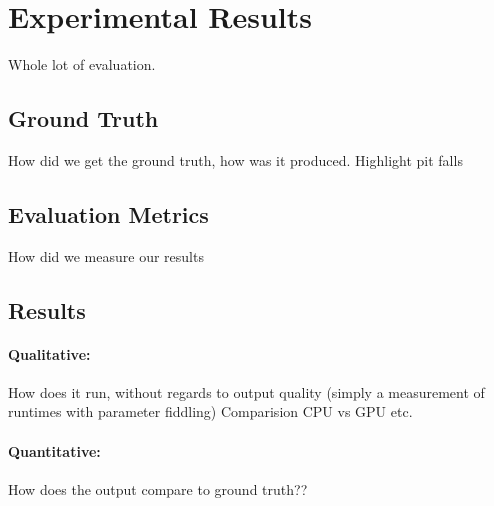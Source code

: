 \section{Experimental Results}
Whole lot of evaluation.

\subsection{Ground Truth}
How did we get the ground truth, how was it produced. Highlight pit falls
\subsection{Evaluation Metrics}
How did we measure our results

\subsection{Results}
\paragraph{Qualitative:} How does it run, without regards to output quality (simply a measurement of runtimes with parameter fiddling)
Comparision CPU vs GPU etc.

\paragraph{Quantitative:} How does the output compare to ground truth??
